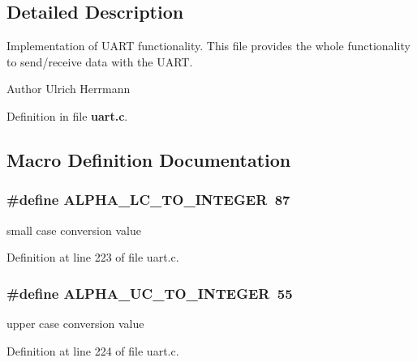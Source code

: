 \subsection{Detailed Description}
Implementation of U\-A\-R\-T functionality. This file provides the whole functionality to send/receive data with the U\-A\-R\-T.

\begin{DoxyAuthor}{Author}
Ulrich Herrmann 
\end{DoxyAuthor}


Definition in file {\bf uart.\-c}.



\subsection{Macro Definition Documentation}
\subsubsection[{A\-L\-P\-H\-A\-\_\-\-L\-C\-\_\-\-T\-O\-\_\-\-I\-N\-T\-E\-G\-E\-R}]{\setlength{\rightskip}{0pt plus 5cm}\#define A\-L\-P\-H\-A\-\_\-\-L\-C\-\_\-\-T\-O\-\_\-\-I\-N\-T\-E\-G\-E\-R~87}\label{uart_8c_aaa0cd2727535b2a91d39b6cfa0d499e4}
small case conversion value 

Definition at line 223 of file uart.\-c.

\subsubsection[{A\-L\-P\-H\-A\-\_\-\-U\-C\-\_\-\-T\-O\-\_\-\-I\-N\-T\-E\-G\-E\-R}]{\setlength{\rightskip}{0pt plus 5cm}\#define A\-L\-P\-H\-A\-\_\-\-U\-C\-\_\-\-T\-O\-\_\-\-I\-N\-T\-E\-G\-E\-R~55}\label{uart_8c_a70c4bfefd3251ea8ca151b6c45247ced}
upper case conversion value 

Definition at line 224 of file uart.\-c.



